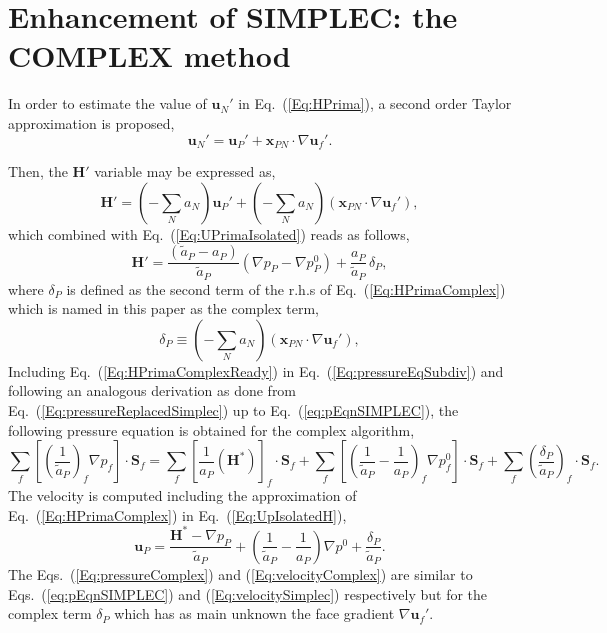 \documentclass[final,3p,times,11pt,onecolumn]{myElsarticle}
\numberwithin{equation}{section}
\begin{document}
\section{Enhancement of SIMPLEC: the COMPLEX method}
\label{sec:COMPLEX}

In order to estimate the value of $\boldsymbol{u}_N'$ in Eq.~(\ref{Eq:HPrima}), a second order Taylor approximation is proposed,
\begin{equation}\label{eq:uNTaylor}
\boldsymbol{u}_N' = \boldsymbol{u}_P' + \boldsymbol{x}_{PN}\cdot 
\nabla \boldsymbol{u}_f'.
\end{equation}

Then, the $\boldsymbol{H}'$ variable may be expressed as,
\begin{equation}
\label{Eq:HPrimaComplex}
\boldsymbol{H}'
=
\left(
-\sum_N a_N
\right)
\boldsymbol{u}_P' 
+
\left(
-\sum_N a_N
\right)
\left(
\boldsymbol{x}_{PN}\cdot 
\nabla \boldsymbol{u}_f'
\right),
\end{equation}
which combined with Eq.~(\ref{Eq:UPrimaIsolated}) reads as follows,
\begin{equation}
\label{Eq:HPrimaComplexReady}
\boldsymbol{H}'
= 
\dfrac
{
\left(
\tilde{a}_P
-
a_P
\right)
}
{
\tilde{a}_P
}
\left(
\nabla p_P
-
\nabla p_P^{0}
\right)
+
\dfrac{a_P}{\tilde{a}_P}
\,
\delta_P,
\end{equation}
where $\delta_P$ is defined as the second term of the r.h.s of Eq.~(\ref{Eq:HPrimaComplex}) which is named in this paper as the complex term,
\begin{equation}
\delta_P 
\equiv 
\left(
-\sum_N a_N
\right)
\left(
\boldsymbol{x}_{PN}\cdot 
\nabla \boldsymbol{u}_f'
\right),
\end{equation}
Including Eq.~(\ref{Eq:HPrimaComplexReady}) in Eq.~(\ref{Eq:pressureEqSubdiv}) and following an analogous derivation as done from Eq.~(\ref{Eq:pressureReplacedSimplec}) up to Eq.~(\ref{eq:pEqnSIMPLEC}), the following pressure equation is obtained for the complex algorithm,
\begin{equation}
\label{Eq:pressureComplex}
\sum_f
\left[
\left(
\dfrac
{1}
{\tilde{a}_P}
\right)_f
\nabla p_f
\right]
\cdot 
\boldsymbol{S}_f
= 
\sum_f 
\left[
\frac{1}{a_P}
\left(
\boldsymbol{H}^*
\right)
\right]_f 
\cdot
\boldsymbol{S}_f
+
\sum_f
\left[
\left(
\dfrac
{1}
{\tilde{a}_P}
-
\dfrac
{1}
{a_P}
\right)_f
\nabla p^{0}_f
\right]
\cdot
\boldsymbol{S}_f
+
\sum_f
\left(
\dfrac{\delta_P}{\tilde{a}_P}
\right)_f
\cdot
\boldsymbol{S}_f.
\end{equation}
The velocity is computed including the approximation of Eq.~(\ref{Eq:HPrimaComplex}) in Eq.~(\ref{Eq:UpIsolatedH}),
\begin{equation}
\label{Eq:velocityComplex}
\boldsymbol{u}_P 
=
\dfrac
{
\boldsymbol{H}^*
- 
\nabla p_P}
{\tilde{a}_P}
+
\left(
\dfrac{1}
{\tilde{a}_P}
-
\dfrac{1}
{a_P}
\right)
\nabla p^{0}
+
\dfrac{\delta_P}
{\tilde{a}_P}.
\end{equation}
The Eqs.~(\ref{Eq:pressureComplex}) and (\ref{Eq:velocityComplex}) are similar to Eqs.~(\ref{eq:pEqnSIMPLEC}) and (\ref{Eq:velocitySimplec}) respectively but for the complex term $\delta_P$ which has as main unknown the face gradient $\nabla \boldsymbol{u}_f'$.
\end{document}
